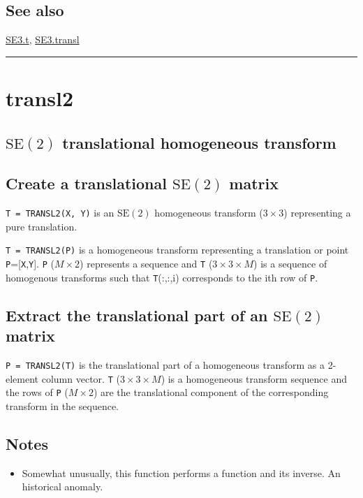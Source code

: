 \subsection*{See also}


\hyperlink{SE3.t}{\color{blue} SE3.t}, \hyperlink{SE3.transl}{\color{blue} SE3.transl}

\vspace{1.5ex}\rule{\textwidth}{1mm}

\hypertarget{transl2}{\section*{transl2}}
\subsection*{$\mbox{SE}(2)$ translational homogeneous transform}

\subsection*{Create a translational $\mbox{SE}(2)$ matrix}


\texttt{T = TRANSL2(X, Y)} is an $\mbox{SE}(2)$ homogeneous transform ($3 \times 3$) representing a
pure translation.



\texttt{T = TRANSL2(P)} is a homogeneous transform representing a translation or
point \texttt{P}=[\texttt{X},\texttt{Y}]. \texttt{P} ($M \times 2$) represents a sequence and \texttt{T} ($3 \times 3 \times M$) is a
sequence of homogenous transforms such that \texttt{T}(:,:,i) corresponds to the
i\textquotesingle th row of \texttt{P}.


\subsection*{Extract the translational part of an $\mbox{SE}(2)$ matrix}


\texttt{P = TRANSL2(T)} is the translational part of a homogeneous transform as a
2-element column vector.  \texttt{T} ($3 \times 3 \times M$) is a homogeneous transform
sequence and the rows of \texttt{P} ($M \times 2$) are the translational component of the
corresponding transform in the sequence.


\subsection*{Notes}
\begin{itemize}
  \item Somewhat unusually, this function performs a function and its inverse.  An    historical anomaly.
\end{itemize}

